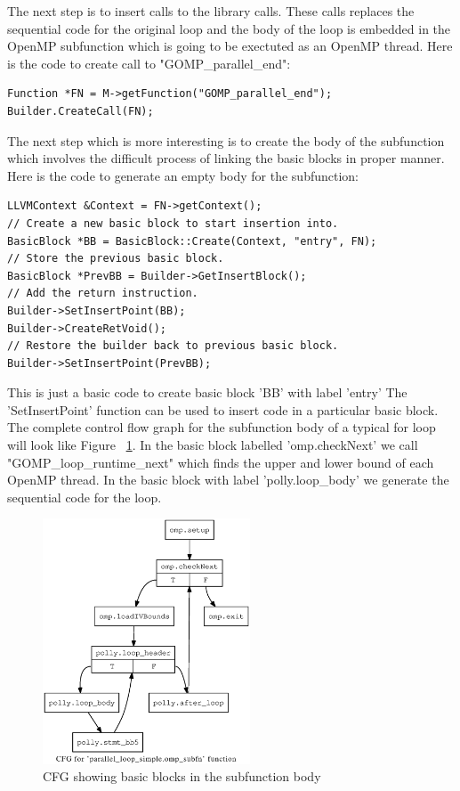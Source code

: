 The next step is to insert calls to the library calls. These calls replaces the sequential code for
the original loop and the body of the loop is embedded in the OpenMP subfunction which is
going to be exectuted as an OpenMP thread. Here is the code to create call to "GOMP\_parallel\_end":
{\footnotesize
\begin{lstlisting}
Function *FN = M->getFunction("GOMP_parallel_end");
Builder.CreateCall(FN);
\end{lstlisting}
}

The next step which is more interesting is to create the body of the subfunction which involves the difficult process of
linking the basic blocks in proper manner. Here is the code to generate an empty body for the subfunction:
{\footnotesize
\begin{lstlisting}
LLVMContext &Context = FN->getContext();
// Create a new basic block to start insertion into.
BasicBlock *BB = BasicBlock::Create(Context, "entry", FN);
// Store the previous basic block.
BasicBlock *PrevBB = Builder->GetInsertBlock();
// Add the return instruction.
Builder->SetInsertPoint(BB);
Builder->CreateRetVoid();
// Restore the builder back to previous basic block.
Builder->SetInsertPoint(PrevBB);
\end{lstlisting}
}
This is just a basic code to create basic block 'BB' with label 'entry' The 'SetInsertPoint' function
can be used to insert code in a particular basic block. The complete control flow graph for the
subfunction body of a typical for loop will look like Figure ~\ref{fig:subfunction_cfg}. In the basic
block labelled 'omp.checkNext' we call "GOMP\_loop\_runtime\_next" which finds the upper and 
lower bound of each OpenMP thread. In the basic block with label 'polly.loop\_body' we
generate the sequential code for the loop.

\begin{figure}
\begin{center}
  \includegraphics[width=0.55\textwidth]{images/cfg2.ps}
  \caption{CFG showing basic blocks in the subfunction body}
  \label{fig:subfunction_cfg}
\end{center}
\end{figure}


